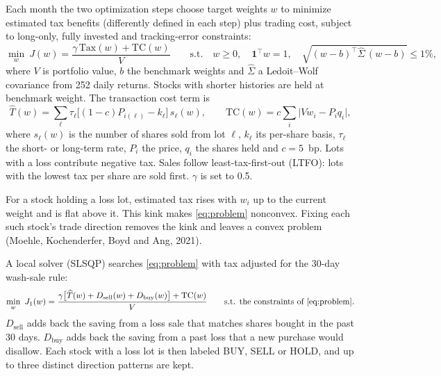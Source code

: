  Each month the two optimization steps choose target weights $w$ to minimize estimated tax benefits (differently defined in each step) plus trading cost, subject to long-only, fully invested and tracking-error constraints:
\begin{equation}
  \min_w\ J(w)=\frac{\gamma\,\mathrm{Tax}(w)+\mathrm{TC}(w)}{V}
  \qquad\text{s.t.}\quad w\ge0,\quad \mathbf 1^\top w=1,\quad \sqrt{(w-b)^\top\widehat\Sigma\,(w-b)}\le1\%,
  \label{eq:problem}
\end{equation}
where $V$ is portfolio value, $b$ the benchmark weights and $\widehat\Sigma$ a Ledoit--Wolf covariance from 252 daily returns. Stocks with shorter histories are held at benchmark weight. The transaction cost term is
\begin{equation}
  \widehat T(w)=\sum_\ell \tau_\ell\big[(1-c)P_{i(\ell)}-k_\ell\big]\,s_\ell(w),
  \qquad
  \mathrm{TC}(w)=c\sum_i\big|Vw_i-P_iq_i\big|,
  \label{eq:costs}
\end{equation}
where $s_\ell(w)$ is the number of shares sold from lot $\ell$, $k_\ell$ its per-share basis, $\tau_\ell$ the short- or long-term rate, $P_i$ the price, $q_i$ the shares held and $c=5$~bp. Lots with a loss contribute negative tax. Sales follow least-tax-first-out (LTFO): lots with the lowest tax per share are sold first. $\gamma$ is set to 0.5.

 For a stock holding a loss lot, estimated tax rises with $w_i$ up to the current weight and is flat above it. This kink makes \eqref{eq:problem} nonconvex. Fixing each such stock's trade direction removes the kink and leaves a convex problem (Moehle, Kochenderfer, Boyd and Ang, 2021).

 A local solver (SLSQP) searches \eqref{eq:problem} with tax adjusted for the 30-day wash-sale rule:
\begin{equation}
  \min_w\ J_1(w)=\frac{\gamma\big[\widehat T(w)+D_{\mathrm{sell}}(w)+D_{\mathrm{buy}}(w)\big]+\mathrm{TC}(w)}{V}
  \qquad\text{s.t. the constraints of \eqref{eq:problem}}.
  \label{eq:stage1}
\end{equation}
$D_{\mathrm{sell}}$ adds back the saving from a loss sale that matches shares bought in the past 30 days. $D_{\mathrm{buy}}$ adds back the saving from a past loss that a new purchase would disallow. Each stock with a loss lot is then labeled BUY, SELL or HOLD, and up to three distinct direction patterns are kept.

